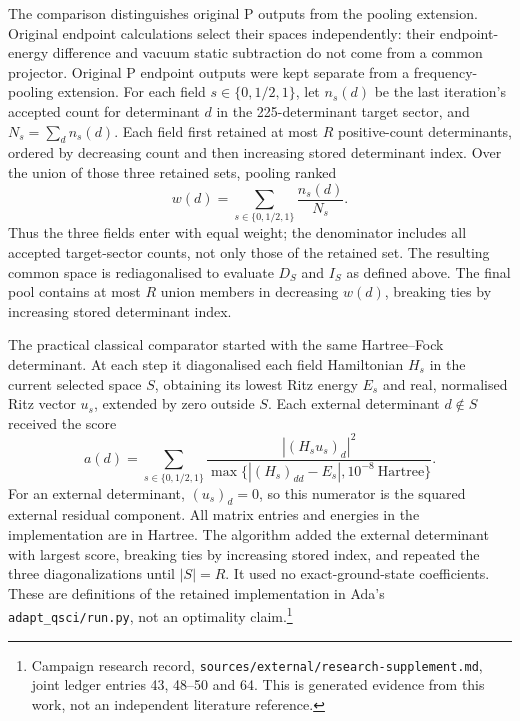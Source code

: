 \documentclass{article}
\newcommand{\record}[1]{\footnote{Campaign research record, \texttt{sources/external/research-supplement.md}, #1. This is generated evidence from this work, not an independent literature reference.}}
\begin{document}
The comparison distinguishes original P outputs from the pooling extension. Original endpoint calculations select their spaces independently: their endpoint-energy difference and vacuum static subtraction do not come from a common projector. Original P endpoint outputs were kept separate from a frequency-pooling extension. For each field \(s\in\{0,1/2,1\}\), let \(n_s(d)\) be the last iteration's accepted count for determinant \(d\) in the 225-determinant target sector, and \(N_s=\sum_d n_s(d)\). Each field first retained at most \(R\) positive-count determinants, ordered by decreasing count and then increasing stored determinant index. Over the union of those three retained sets, pooling ranked
\[
 w(d)=\sum_{s\in\{0,1/2,1\}}\frac{n_s(d)}{N_s}.
\]
Thus the three fields enter with equal weight; the denominator includes all accepted target-sector counts, not only those of the retained set. The resulting common space is rediagonalised to evaluate \(D_S\) and \(I_S\) as defined above. The final pool contains at most \(R\) union members in decreasing \(w(d)\), breaking ties by increasing stored determinant index.

The practical classical comparator started with the same Hartree--Fock determinant. At each step it diagonalised each field Hamiltonian \(H_s\) in the current selected space \(S\), obtaining its lowest Ritz energy \(E_s\) and real, normalised Ritz vector \(u_s\), extended by zero outside \(S\). Each external determinant \(d\notin S\) received the score
\[
 a(d)=\sum_{s\in\{0,1/2,1\}}
 \frac{|(H_su_s)_d|^2}{\max\{|(H_s)_{dd}-E_s|,10^{-8}\ \mathrm{Hartree}\}}.
\]
For an external determinant, \((u_s)_d=0\), so this numerator is the squared external residual component. All matrix entries and energies in the implementation are in Hartree. The algorithm added the external determinant with largest score, breaking ties by increasing stored index, and repeated the three diagonalizations until \(|S|=R\). It used no exact-ground-state coefficients. These are definitions of the retained implementation in Ada's \texttt{adapt\_qsci/run.py}, not an optimality claim.\record{joint ledger entries 43, 48--50 and 64}
\end{document}
